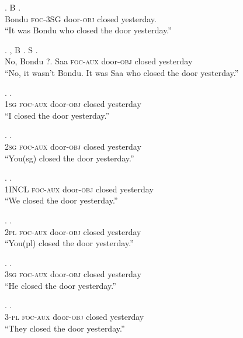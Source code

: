 \documentclass{assets/fieldnotes}
\begin{document}
\exg. B    .\\
Bondu \textsc{foc-3SG} door-\textsc{obj} closed yesterday.\\
``It was Bondu who closed the door yesterday.''

\exg. , B . S    .\\
No, Bondu ?. Saa \textsc{foc-aux} door-\textsc{obj} closed yesterday\\
``No, it wasn't Bondu. It was Saa who closed the door yesterday.''


\exg.     .\\
1\textsc{sg} \textsc{foc-aux} door-\textsc{obj} closed yesterday\\
``I closed the door yesterday.''

\exg.     .\\
2\textsc{sg} \textsc{foc-aux} door-\textsc{obj} closed yesterday\\
``You(sg) closed the door yesterday.''

\exg.     .\\
1\textsc{INCL} \textsc{foc-aux} door-\textsc{obj} closed yesterday\\
``We closed the door yesterday.''

\exg.     .\\
2\textsc{pl} \textsc{foc-aux} door-\textsc{obj} closed yesterday\\
``You(pl) closed the door yesterday.''

\exg.     .\\
3\textsc{sg} \textsc{foc-aux} door-\textsc{obj} closed yesterday\\
``He closed the door yesterday.''

\exg.     .\\
3-\textsc{pl} \textsc{foc-aux} door-\textsc{obj} closed yesterday\\
``They closed the door yesterday.''
\end{document}
